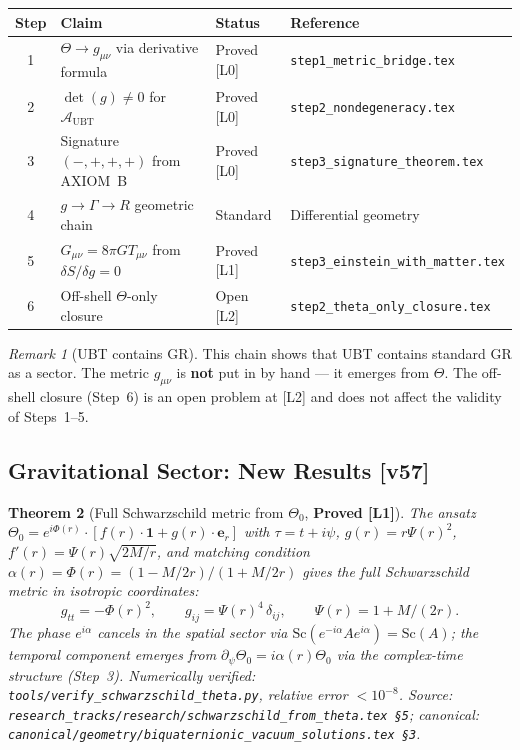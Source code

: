 \documentclass[12pt]{article}
\newtheorem{theorem}{Theorem}[section]
\theoremstyle{definition}
\theoremstyle{remark}
\newtheorem{remark}[theorem]{Remark}
\begin{document}
\begin{center}
\begin{tabular}{clll}
\hline
\textbf{Step} & \textbf{Claim} & \textbf{Status} & \textbf{Reference} \\
\hline
1 & $\Theta \to g_{\mu\nu}$ via derivative formula & Proved [L0] & \texttt{step1\_metric\_bridge.tex} \\
2 & $\det(g) \neq 0$ for $\mathcal{A}_\mathrm{UBT}$ & Proved [L0] & \texttt{step2\_nondegeneracy.tex} \\
3 & Signature $(-,+,+,+)$ from AXIOM~B & Proved [L0] & \texttt{step3\_signature\_theorem.tex} \\
4 & $g \to \Gamma \to R$ geometric chain & Standard & Differential geometry \\
5 & $G_{\mu\nu} = 8\pi G T_{\mu\nu}$ from $\delta S/\delta g = 0$ & Proved [L1] & \texttt{step3\_einstein\_with\_matter.tex} \\
6 & Off-shell $\Theta$-only closure & Open [L2] & \texttt{step2\_theta\_only\_closure.tex} \\
\hline
\end{tabular}
\end{center}

\begin{remark}[UBT contains GR]
This chain shows that UBT contains standard GR as a sector.
The metric $g_{\mu\nu}$ is \textbf{not} put in by hand — it emerges from $\Theta$.
The off-shell closure (Step~6) is an open problem at [L2] and
does not affect the validity of Steps~1--5.
\end{remark}

\subsection{Gravitational Sector: New Results [v57]}
\label{sec:gr_gravity_new}

\begin{theorem}[Full Schwarzschild metric from $\Theta_0$, \textbf{Proved [L1]}]
\label{thm:schwarzschild_canonical}
The ansatz $\Theta_0 = e^{i\Phi(r)}\cdot[f(r)\cdot\mathbf{1}+g(r)\cdot\boldsymbol{e}_r]$
with $\tau = t + i\psi$, $g(r) = r\Psi(r)^2$, $f'(r) = \Psi(r)\sqrt{2M/r}$,
and matching condition $\alpha(r) = \Phi(r) = (1-M/2r)/(1+M/2r)$ gives the
full Schwarzschild metric in isotropic coordinates:
\[
  g_{tt} = -\Phi(r)^2,\qquad g_{ij} = \Psi(r)^4\,\delta_{ij},
  \qquad \Psi(r) = 1 + M/(2r).
\]
The phase $e^{i\alpha}$ cancels in the spatial sector via
$\mathrm{Sc}(e^{-i\alpha}Ae^{i\alpha}) = \mathrm{Sc}(A)$; the temporal
component emerges from $\partial_\psi\Theta_0 = i\alpha(r)\Theta_0$ via
the complex-time structure (Step~3).
Numerically verified: \texttt{tools/verify\_schwarzschild\_theta.py},
relative error $< 10^{-8}$.
Source: \texttt{research\_tracks/research/schwarzschild\_from\_theta.tex §5};
canonical: \texttt{canonical/geometry/biquaternionic\_vacuum\_solutions.tex §3}.
\end{theorem}
\end{document}
